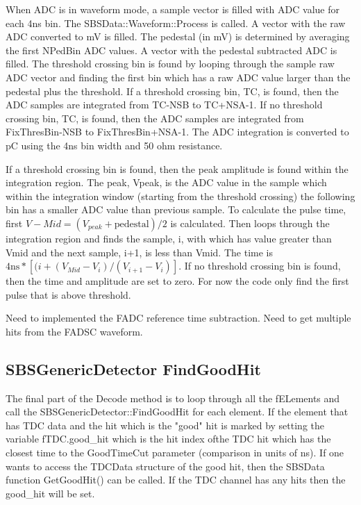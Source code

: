 \documentclass[11pt]{article}
\begin{document}
When ADC is in waveform mode, a sample vector is filled with ADC value for
each 4ns bin. The SBSData::Waveform::Process is called.
A vector with the raw ADC converted to mV is filled. The pedestal (in mV) is determined by averaging the first NPedBin ADC values. A vector with the pedestal subtracted ADC is filled.
The threshold crossing bin is found by looping through the sample raw ADC vector and finding the first bin which has a raw ADC value larger than the pedestal plus the threshold.
If a threshold crossing bin, TC, is found, then the ADC samples are integrated from TC-NSB to TC+NSA-1.
If no  threshold crossing bin, TC, is found, then the ADC samples are integrated from FixThresBin-NSB to FixThresBin+NSA-1.
The ADC integration is converted to pC using the 4ns bin width and 50 ohm resistance.

If a threshold crossing bin is found, then the peak amplitude is found within the integration region. The peak, Vpeak,  is the ADC value in the sample which within the integration window (starting from the threshold crossing) the following bin has a smaller ADC value than previous sample.
To calculate the pulse time, first  $V-{Mid} = (V_{peak} + \mbox{pedestal})/2$ is calculated. Then loops through the
integration region and finds the sample, i, with which has value greater than Vmid and the next sample, i+1, is
less than Vmid. The time is $4\mbox{ns}*\left[(i+(V_{Mid}-V_i)/(V_{i+1}-V_i)\right]$.
If no threshold crossing bin is found, then the time and amplitude are set to zero.
For now the code only find the first pulse that is above threshold.

{\color{red} Need to implemented the FADC reference time subtraction. Need to  get multiple hits from the
	FADSC waveform.}

\subsection{SBSGenericDetector FindGoodHit}
  The final part of the Decode method is to loop through all the fELements and
call the SBSGenericDetector::FindGoodHit for each element.
If the element that has TDC data and the hit which
is the "good" hit is marked by setting the variable fTDC.good\_hit which is the hit index   ofthe
TDC hit which has the closest time to the GoodTimeCut parameter (comparison in units of ns).
If one wants to access the TDCData structure of the good hit, then the SBSData function GetGoodHit()
can be called. If the TDC channel has any hits then the good\_hit will be set.
\end{document}
